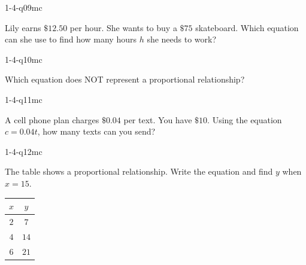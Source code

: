 \begin{practiceQuestion}{1-4-q09}{mc}
\begin{questionText}
Lily earns $\$12.50$ per hour. She wants to buy a $\$75$ skateboard. Which equation can she use to find how many hours $h$ she needs to work?
\end{questionText}
\end{practiceQuestion}

\begin{practiceQuestion}{1-4-q10}{mc}
\begin{questionText}
Which equation does NOT represent a proportional relationship?
\end{questionText}
\end{practiceQuestion}

\begin{practiceQuestion}{1-4-q11}{mc}
\begin{questionText}
A cell phone plan charges $\$0.04$ per text. You have $\$10$. Using the equation $c = 0.04t$, how many texts can you send?
\end{questionText}
\end{practiceQuestion}

\begin{practiceQuestion}{1-4-q12}{mc}
\begin{questionText}
The table shows a proportional relationship. Write the equation and find $y$ when $x = 15$.

\begin{center}
\begin{tabular}{|c|c|}
\hline $x$ & $y$ \\ \hline $2$ & $7$ \\ $4$ & $14$ \\ $6$ & $21$ \\ \hline
\end{tabular}
\end{center}
\end{questionText}
\end{practiceQuestion}

